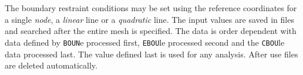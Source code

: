  \\{\smallskip}
 \\{\smallskip}
 \\{\smallskip}
 \\{\smallskip}
 \\{\smallskip}
 \\{\smallskip}
 \\{\smallskip}
 \\{\smallskip}
 \\{\smallskip}
 \\{\smallskip}
 \\{\smallskip}
 \\{\smallskip}
 \\{\smallskip}
 \\{\smallskip}
 \\{\smallskip}
 \\{\smallskip}
 \\{\smallskip}
\headb

The boundary restraint conditions may be set using
the reference coordinates for a single {\it node}, a {\it linear}
line or a {\it quadratic} line.  The input values are saved
in files and searched after the entire mesh is specified.
The data is order dependent with data
defined by {\tt BOUN}e processed first, {\tt EBOU}le processed second and
the {\tt CBOU}le data processed last.  The value defined last is used for
any analysis.
After use files are deleted automatically.

